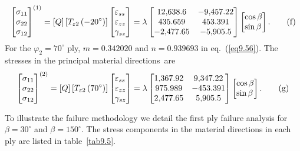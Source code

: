 \documentclass{AeroStructure-ERJohnson}
\begin{document}
\begin{example}
\begin{equation}
\left[\begin{array}{@{}l@{}}\sigma_{11} \\\sigma_{22} \\\sigma_{12}\end{array}\right]^{(1)}=[Q]\left[T_{\varepsilon 2}\left(-20^{\circ}\right)\right]\left[\begin{array}{@{}l@{}}\varepsilon_{s s} \\\varepsilon_{z z} \\\gamma_{s z}\end{array}\right]=\lambda\left[\begin{array}{@{}cc@{}}12{,}638.6 & -9{,}457.22 \\435.659 & 453.391 \\-2{,}477.65 & -5{,}905.5\end{array}\right]\left[\begin{array}{@{}l@{}}\cos \beta \\\sin \beta\end{array}\right]. \label{eq9.1.f}\tag{f}
\end{equation}
For the $\varphi_{2}=70^{\circ}$ ply, $m=0.342020$ and $n=0.939693$ in eq.~(\ref{eq9.56}). The stresses in the principal material directions~are
\begin{equation}
\left[\begin{array}{@{}l@{}}\sigma_{11} \\\sigma_{22} \\\sigma_{12}\end{array}\right]^{(2)}=[Q]\left[T_{\varepsilon 2}\left(70^{\circ}\right)\right]\left[\begin{array}{@{}l@{}}\varepsilon_{s s} \\\varepsilon_{z z} \\\gamma_{s z}\end{array}\right]=\lambda\left[\begin{array}{@{}cc@{}}1{,}367.92 & 9{,}347.22 \\975.989 & -453.391 \\2{,}477.65 & 5{,}905.5\end{array}\right]\left[\begin{array}{@{}l@{}}\cos \beta \\\sin \beta\end{array}\right]. \label{eq9.1.g}\tag{g}
\end{equation}

\vspace*{-1pc}

To illustrate the failure methodology we detail the first ply failure analysis for $\beta=30^{\circ}$ and $\beta=150^{\circ}$. The stress components in the material directions in each ply are listed in table~\ref{tab9.5}.


\end{example}
\end{document}
